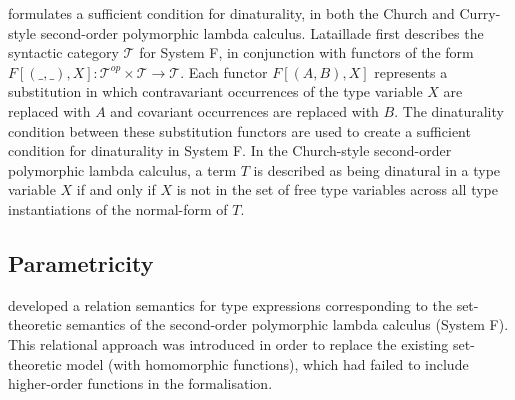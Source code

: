 \documentclass[../../Dissertation.tex]{subfiles}
\begin{document}
 formulates a sufficient condition for dinaturality, in both the Church and Curry-style second-order polymorphic lambda calculus. Lataillade first describes the syntactic category $\mathcal{T}$ for System F, in conjunction with
functors of the form $F[(\_,\_),X] : \mathcal{T}^{op} \times \mathcal{T} \rightarrow \mathcal{T}$. Each functor $F[(A,B),X]$ represents a substitution in which contravariant occurrences of the type variable $X$ are replaced with $A$ and covariant occurrences are replaced with $B$. The dinaturality condition between these substitution functors are used to create a sufficient condition for dinaturality in System F. In the Church-style second-order polymorphic lambda calculus, a term $T$ is described as being dinatural in a type variable $X$ if and only if $X$ is not in the set of free type variables across all type instantiations of the normal-form of $T$.

\subsection{Parametricity}
 developed a relation semantics for type expressions corresponding to the set-theoretic semantics of the second-order polymorphic lambda calculus (System F). This relational approach was introduced in order to replace the existing set-theoretic model (with homomorphic functions), which had failed to include higher-order functions in the formalisation.
\end{document}
